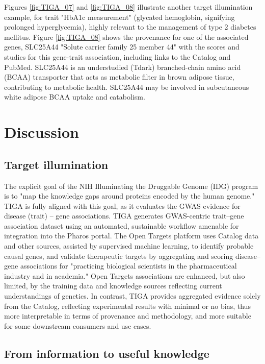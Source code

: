 Figures \ref{fig:TIGA_07} and \ref{fig:TIGA_08} illustrate another target illumination example, for trait "HbA1c measurement" (glycated hemoglobin, signifying prolonged hyperglycemia), highly relevant to the management of type 2 diabetes mellitus\cite{Rahbar1969-vx,Saudek2009-bi}. Figure \ref{fig:TIGA_08} shows the provenance for one of the associated genes, SLC25A44 "Solute carrier family 25 member 44" with the scores and studies for this gene-trait association, including links to the Catalog and PubMed. SLC25A44 is an understudied (Tdark) branched-chain amino acid (BCAA) transporter that acts as metabolic filter in brown adipose tissue, contributing to metabolic health\cite{Yoneshiro2019-ke}. SLC25A44 may be involved in subcutaneous white adipose BCAA uptake and catabolism\cite{Lee2021-re}. 

\section{Discussion}

\subsection{Target illumination}

The explicit goal of the NIH Illuminating the Druggable Genome (IDG) program\cite{Oprea2018-cp} is to "map the knowledge gaps around proteins encoded by the human genome." TIGA is fully aligned with this goal, as it evaluates the GWAS evidence for disease (trait) – gene associations. TIGA generates GWAS-centric trait–gene association dataset using an automated, sustainable workflow amenable for integration into the Pharos portal\cite{Nguyen2017-lo,Sheils2021-ft}. The Open Targets platform\cite{Ochoa2020-ew,Ghoussaini2021-au} uses Catalog data and other sources, assisted by supervised machine learning, to identify probable causal genes, and validate therapeutic targets by aggregating and scoring disease–gene associations for "practicing biological scientists in the pharmaceutical industry and in academia." Open Targets associations are enhanced, but also limited, by the training data and knowledge sources reflecting current understandings of genetics. In contrast, TIGA provides aggregated evidence solely from the Catalog, reflecting experimental results with minimal or no bias, thus more interpretable in terms of provenance and methodology, and more suitable for some downstream consumers and use cases.

\subsection{From information to useful knowledge}

